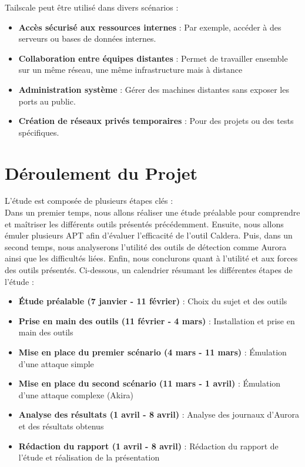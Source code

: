 \documentclass[12pt,letterpaper]{article}
\begin{document}
Tailscale peut être utilisé dans divers scénarios :
\begin{itemize}
    \item \textbf{Accès sécurisé aux ressources internes} : Par exemple, accéder à des serveurs ou bases de données internes.
    \item \textbf{Collaboration entre équipes distantes} : Permet de travailler ensemble sur un même réseau, une même infrastructure mais à distance
    \item \textbf{Administration système} : Gérer des machines distantes sans exposer les ports au public.
    \item \textbf{Création de réseaux privés temporaires} : Pour des projets ou des tests spécifiques.
\end{itemize}

\newpage
\section{Déroulement du Projet}

L'étude est composée de plusieurs étapes clés : \\
Dans un premier temps, nous allons réaliser une étude préalable pour comprendre et maîtriser les différents outils présentés précédemment.
Ensuite, nous allons émuler plusieurs APT afin d'évaluer l'efficacité de l'outil Caldera.
Puis, dans un second temps, nous analyserons l'utilité des outils de détection comme Aurora ainsi que les difficultés liées.
Enfin, nous conclurons quant à l'utilité et aux forces des outils présentés.
Ci-dessous, un calendrier résumant les différentes étapes de l'étude :
\begin{itemize}
    \item \textbf{Étude préalable (7 janvier - 11 février)} : Choix du sujet et des outils
    \item \textbf{Prise en main des outils (11 février - 4 mars)} : Installation et prise en main des outils
    \item \textbf{Mise en place du premier scénario (4 mars - 11 mars)} : Émulation d'une attaque simple
    \item \textbf{Mise en place du second scénario (11 mars - 1 avril)} : Émulation d'une attaque complexe (Akira)
    \item \textbf{Analyse des résultats (1 avril - 8 avril)} : Analyse des journaux d'Aurora et des résultats obtenus
    \item \textbf{Rédaction du rapport (1 avril - 8 avril)} : Rédaction du rapport de l'étude et réalisation de la présentation
\end{itemize}
\end{document}

